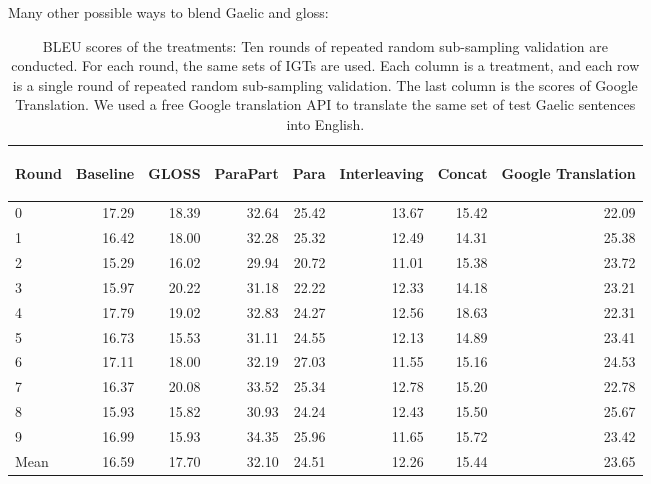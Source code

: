\documentclass[a4paper]{article}
\begin{document}
\newpage
\begin{exe}
\ex Many other possible ways to blend Gaelic and gloss:
\begin{table}[ht]
\centering
\begin{tabular}{lrrrrrrr}
  \hline
\begin{sideways} Round \end{sideways} & \begin{sideways} Baseline \end{sideways} & \begin{sideways} GLOSS \end{sideways} & \begin{sideways} ParaPart \end{sideways} & \begin{sideways} Para \end{sideways} & \begin{sideways} Interleaving \end{sideways} & \begin{sideways} Concat \end{sideways} & \begin{sideways} Google Translation \end{sideways} \\ 
  \hline
0 & 17.29 & 18.39 & 32.64 & 25.42 & 13.67 & 15.42 & 22.09 \\ 
  1 & 16.42 & 18.00 & 32.28 & 25.32 & 12.49 & 14.31 & 25.38 \\ 
  2 & 15.29 & 16.02 & 29.94 & 20.72 & 11.01 & 15.38 & 23.72 \\ 
  3 & 15.97 & 20.22 & 31.18 & 22.22 & 12.33 & 14.18 & 23.21 \\ 
  4 & 17.79 & 19.02 & 32.83 & 24.27 & 12.56 & 18.63 & 22.31 \\ 
  5 & 16.73 & 15.53 & 31.11 & 24.55 & 12.13 & 14.89 & 23.41 \\ 
  6 & 17.11 & 18.00 & 32.19 & 27.03 & 11.55 & 15.16 & 24.53 \\ 
  7 & 16.37 & 20.08 & 33.52 & 25.34 & 12.78 & 15.20 & 22.78 \\ 
  8 & 15.93 & 15.82 & 30.93 & 24.24 & 12.43 & 15.50 & 25.67 \\ 
  9 & 16.99 & 15.93 & 34.35 & 25.96 & 11.65 & 15.72 & 23.42 \\ 
   \hline
Mean & 16.59 & 17.70 & 32.10 & 24.51 & 12.26 & 15.44 & 23.65 \\ 
   \hline
\end{tabular}
\caption{BLEU scores of the treatments: Ten rounds of repeated random sub-sampling validation are conducted. For each round, the same sets of IGTs are used. Each column is a treatment, and each row is a single round of repeated random sub-sampling validation. The last column is the scores of Google Translation. We used a free Google translation API \citep{google_api} to translate the same set of test Gaelic sentences into English.} 
\label{table:complete_table}
\end{table}\end{exe}




\end{document}
